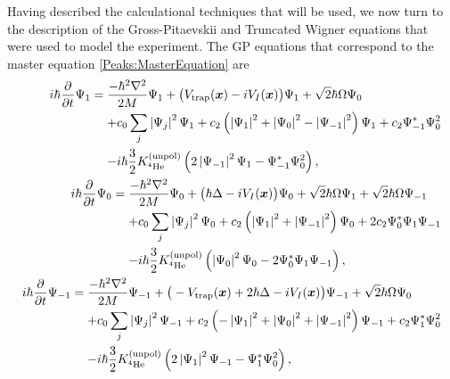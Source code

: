 Having described the calculational techniques that will be used, we now turn to the description of the Gross-Pitaevskii and Truncated Wigner equations that were used to model the experiment. The GP equations that correspond to the master equation \eqref{Peaks:MasterEquation} are
\begin{subequations}
    \label{Peaks:3DGPEquations}
    \begin{align}
        \begin{split}
            i \hbar \frac{\partial }{\partial t}\Psi_1 &= \frac{-\hbar^2 \nabla^2}{2 M} \Psi_1 + \big(V_\text{trap}(\bm{x}) - i V_I(\bm{x})\big)\Psi_1 + \sqrt{2} \hbar \Omega \Psi_0 \\
            & \relphantom{=} + c_0 \sum_j \abs{\Psi_j}^2 \Psi_1 + c_2\left(\abs{\Psi_1}^2 + \abs{\Psi_0}^2 - \abs{\Psi_{-1}}^2 \right) \Psi_1 + c_2 \Psi_{-1}^*\Psi_0^2 \\
            & \relphantom{=} - i \hbar\frac{3}{2}K^\text{(unpol)}_{^{4}\text{He}} \left(2\abs{\Psi_{-1}}^2 \Psi_1 - \Psi_{-1}^* \Psi_0^2\right),
        \end{split}\\
        \begin{split}
            i \hbar \frac{\partial }{\partial t}\Psi_0 &= \frac{-\hbar^2 \nabla^2}{2 M} \Psi_0 + \big(\hbar \Delta - i V_I(\bm{x}) \big)\Psi_0 + \sqrt{2} \hbar \Omega \Psi_1 + \sqrt{2}\hbar\Omega \Psi_{-1} \\
            & \relphantom{=} + c_0 \sum_j \abs{\Psi_j}^2 \Psi_0 + c_2\left(\abs{\Psi_1}^2 + \abs{\Psi_{-1}}^2 \right) \Psi_0 + 2 c_2 \Psi_{0}^*\Psi_1\Psi_{-1} \\
            & \relphantom{=} - i \hbar\frac{3}{2}K^\text{(unpol)}_{^{4}\text{He}} \left(\abs{\Psi_{0}}^2 \Psi_0 - 2\Psi_{0}^* \Psi_1\Psi_{-1}\right),
        \end{split}\\
        \begin{split}
            i \hbar \frac{\partial }{\partial t}\Psi_{-1} &= \frac{-\hbar^2 \nabla^2}{2 M} \Psi_{-1} + \big(-V_\text{trap}(\bm{x}) + 2 \hbar \Delta - i V_I(\bm{x})\big)\Psi_{-1} + \sqrt{2} \hbar \Omega \Psi_0 \\
            & \relphantom{=} + c_0 \sum_j \abs{\Psi_j}^2 \Psi_{-1} + c_2\left(-\abs{\Psi_1}^2 + \abs{\Psi_0}^2 + \abs{\Psi_{-1}}^2 \right) \Psi_{-1} + c_2 \Psi_{1}^*\Psi_0^2 \\
            & \relphantom{=} - i \hbar\frac{3}{2}K^\text{(unpol)}_{^{4}\text{He}} \left(2\abs{\Psi_{1}}^2 \Psi_{-1} - \Psi_{1}^* \Psi_0^2\right),
        \end{split}
    \end{align}
\end{subequations}
